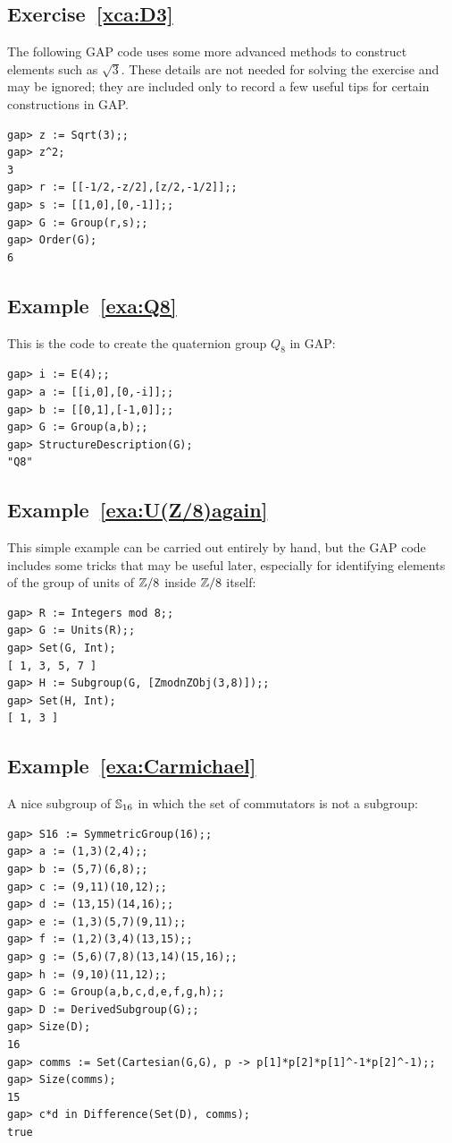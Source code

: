 \subsection*{Exercise~\ref{xca:D3}}

The following GAP code uses some more advanced methods to construct elements such as $\sqrt{3}$. These details are not needed for solving the exercise and may be ignored; they are included only to record a few useful tips for certain constructions in GAP.

\begin{lstlisting}
gap> z := Sqrt(3);;
gap> z^2;
3
gap> r := [[-1/2,-z/2],[z/2,-1/2]];;
gap> s := [[1,0],[0,-1]];;
gap> G := Group(r,s);;
gap> Order(G);
6
\end{lstlisting}

\subsection*{Example~\ref{exa:Q8}}

This is the code to create the quaternion group $Q_8$
in GAP:
\begin{lstlisting}
gap> i := E(4);;
gap> a := [[i,0],[0,-i]];;
gap> b := [[0,1],[-1,0]];;
gap> G := Group(a,b);;
gap> StructureDescription(G);
"Q8"
\end{lstlisting}

\subsection*{Example~\ref{exa:U(Z/8)again}}

This simple example can be carried out entirely by hand,
but the GAP code includes some tricks that may be useful
later, especially for identifying elements of the group
of units of $\mathbb{Z}/8$ inside $\mathbb{Z}/8$ itself:
\begin{lstlisting}
gap> R := Integers mod 8;;
gap> G := Units(R);;
gap> Set(G, Int);
[ 1, 3, 5, 7 ]
gap> H := Subgroup(G, [ZmodnZObj(3,8)]);;
gap> Set(H, Int);
[ 1, 3 ]
\end{lstlisting}

\subsection*{Example~\ref{exa:Carmichael}}
\label{gap:Carmichael}

A nice subgroup of $\mathbb{S}_{16}$
in which the set of commutators is not a subgroup:

\begin{lstlisting}
gap> S16 := SymmetricGroup(16);;
gap> a := (1,3)(2,4);;
gap> b := (5,7)(6,8);;
gap> c := (9,11)(10,12);;
gap> d := (13,15)(14,16);;
gap> e := (1,3)(5,7)(9,11);;
gap> f := (1,2)(3,4)(13,15);;
gap> g := (5,6)(7,8)(13,14)(15,16);;
gap> h := (9,10)(11,12);;
gap> G := Group(a,b,c,d,e,f,g,h);;
gap> D := DerivedSubgroup(G);;
gap> Size(D);
16
gap> comms := Set(Cartesian(G,G), p -> p[1]*p[2]*p[1]^-1*p[2]^-1);;
gap> Size(comms);
15
gap> c*d in Difference(Set(D), comms);
true
\end{lstlisting}

